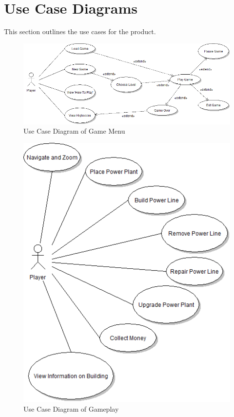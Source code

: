\section{Use Case Diagrams}

This section outlines the use cases for the product.

\begin{figure}[H]
  	\centering
	\includegraphics[scale=0.45]{pictures/UCD_Menu.png}
	\caption{Use Case Diagram of Game Menu}
\end{figure}

\begin{figure}[H]
  	\centering
	\includegraphics[scale=0.5]{pictures/UCD_PlayGame.png}
	\caption{Use Case Diagram of Gameplay}
\end{figure}

